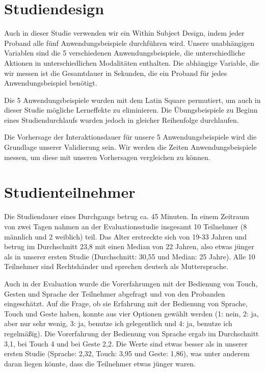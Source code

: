 \section[Studiendesign]{Studiendesign}
Auch in dieser Studie verwenden wir ein Within Subject Design, indem jeder Proband alle fünf Anwendungsbeispiele durchführen wird. Unsere unabhängigen Variablen sind die 5 verschiedenen Anwendungsbeispiele, die unterschiedliche Aktionen in unterschiedlichen Modalitäten enthalten. 
Die abhängige Variable, die wir messen ist die Gesamtdauer in Sekunden, die ein Proband für jedes Anwendungsbeispiel benötigt. 

Die 5 Anwendungsbeispiele wurden mit dem Latin Square permutiert, um auch in dieser Studie mögliche Lerneffekte zu eliminieren. Die Übungsbeispiele zu Beginn eines Studiendurchlaufs wurden jedoch in gleicher Reihenfolge durchlaufen. 

Die Vorhersage der Interaktionsdauer für unsere 5 Anwendungsbeispiele wird die Grundlage unserer Validierung sein. 
Wir werden die Zeiten Anwendungsbeispiele messen, um diese mit unseren Vorhersagen vergleichen zu können. 

\section[Studienteilnehmer]{Studienteilnehmer}
Die Studiendauer eines Durchgangs betrug ca. 45 Minuten. In einem Zeitraum von zwei Tagen nahmen an der Evaluationsstudie insgesamt 10 Teilnehmer (8 männlich und 2 weiblich) teil. Das Alter erstreckte sich von 19-33 Jahren und betrug im Durchschnitt 23,8 mit einen Median von 22 Jahren, also etwas jünger als in unserer ersten Studie (Durchschnitt: 30,55 und Median: 25 Jahre). Alle 10 Teilnehmer sind Rechtshänder und sprechen deutsch als Muttersprache. 

Auch in der Evaluation wurde die Vorerfahrungen mit der Bedienung von Touch, Gesten und Sprache der Teilnehmer abgefragt und von den Probanden eingeschätzt. Auf die Frage, ob sie Erfahrung mit der Bedienung von Sprache, Touch und Geste haben, konnte aus vier Optionen gewählt werden (1: nein, 2: ja, aber nur sehr wenig, 3: ja, benutze ich gelegentlich und 4: ja, benutze ich regelmäßig). Die Vorerfahrung der Bedienung von Sprache ergab im Durchschnitt 3,1, bei Touch 4 und bei Geste 2,2. Die Werte sind etwas besser als in unserer ersten Studie (Sprache: 2,32,  Touch: 3,95 und Geste: 1,86), was unter anderem daran liegen könnte, dass die Teilnehmer etwas jünger waren.

